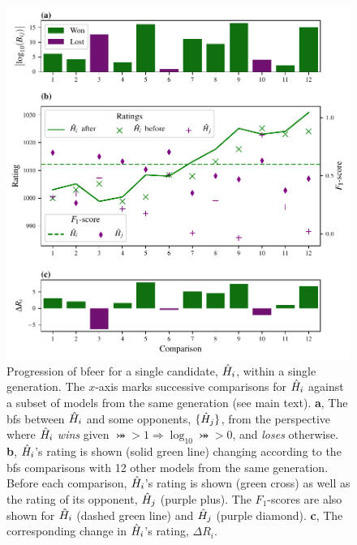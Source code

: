 {\begin{figure}
    \begin{center}
        \includegraphics{theoretical_study/figures/single_generation_ratings_progression.pdf}
    \end{center}
    \caption[Single model within a single generation of QMLA genetic algorithm]{
        Progression of \acrlong{bfeer} for a single candidate, $\hat{H}_i$, within a single generation.
        The $x$-axis marks successive comparisons for $\hat{H}_i$ against a subset of models from the same generation (see main text).
        \textbf{a}, The \glspl{bf} between $\hat{H}_i$ and some opponents, $\{\hat{H}_j\}$, 
            from the perspective where $\hat{H}_i$ \emph{wins} given $\bij > 1 \Rightarrow \log_{10}\bij > 0$, 
            and \emph{loses} otherwise. 
        \textbf{b}, $\hat{H}_i$'s rating is shown (solid green line) changing according to the \glspl{bf} 
            comparisons with 12 other models from the same generation. 
            Before each comparison, $\hat{H}_i$'s rating is shown (green cross)
            as well as the rating of its opponent, $\hat{H}_j$ (purple plus).
            The $F_1$-scores are also shown for $\hat{H}_i$ (dashed green line) and $\hat{H}_j$ (purple diamond).
        \textbf{c}, The corresponding change in $\hat{H}_i$'s rating, $\Delta R_i$. 
        \figtableref
    }
    \label{fig:single_models_elo_ratings}
\end{figure}


}
